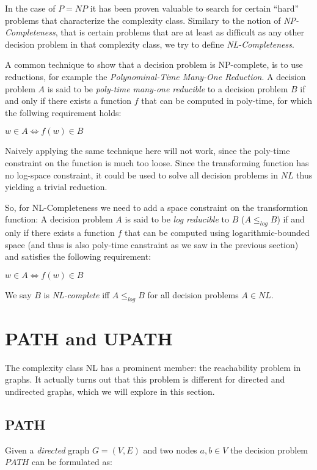 In the case of $P = NP$ it has been proven valuable to search for
certain ``hard'' problems that characterize the complexity class.
Similary to the notion of \emph{NP-Completeness}, that is certain
problems that are at least as difficult as any other decision problem in
that complexity class, we try to define \emph{NL-Completeness}.

A common technique to show that a decision problem is NP-complete, is to
use reductions, for example the \emph{Polynominal-Time Many-One
Reduction}. A decision problem $A$ is said to be \emph{poly-time
many-one reducible} to a decision problem $B$ if and only if there
exists a function $f$ that can be computed in poly-time, for which the
follwing requirement holds:

$w \in A \Leftrightarrow f(w) \in B$

Naively applying the same technique here will not work, since the
poly-time constraint on the function is much too loose. Since the
transforming function has no log-space constraint, it could be used to
solve all decision problems in $NL$ thus yielding a trivial reduction.

So, for NL-Completeness we need to add a space constraint on the
transformtion function: A decision problem $A$ is said to be \emph{log
reducible} to $B$ ($A \leq_{log} B$) if and only if there exists a
function $f$ that can be computed using logarithmic-bounded space (and
thus is also poly-time canstraint as we saw in the previous section) and
satisfies the following requirement:

$w \in A \Leftrightarrow f(w) \in B$

We say $B$ is \emph{NL-complete} iff $A \leq_{log} B$ for all decision
problems $A \in NL$.

\chapter{PATH and UPATH}\label{path-and-upath}

The complexity class NL has a prominent member: the reachability problem
in graphs. It actually turns out that this problem is different for
directed and undirected graphs, which we will explore in this section.

\section{PATH}\label{path}

Given a \emph{directed} graph $G = (V, E)$ and two nodes $a, b \in V$
the decision problem $PATH$ can be formulated as:

